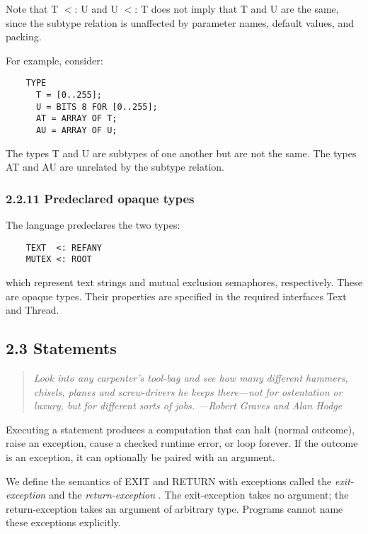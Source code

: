 \documentclass[10pt]{article}
\begin{document}
  Note that T $<$: U and U $<$: T does not imply that T and U are the same, since the subtype relation is unaffected by parameter names, default values, and packing. 


  For example, consider: 
\begin{verbatim}
    TYPE 
      T = [0..255];
      U = BITS 8 FOR [0..255];
      AT = ARRAY OF T;
      AU = ARRAY OF U;
\end{verbatim}
 The types T and U are subtypes of one another but are not the same. The types AT and AU are unrelated by the subtype relation. 


 
\subsubsection*{2.2.11 Predeclared opaque types}


  The language predeclares the two types: 
\begin{verbatim}
    TEXT  <: REFANY
    MUTEX <: ROOT
\end{verbatim}
 which represent text strings and mutual exclusion semaphores, respectively. These are opaque types. Their properties are specified in the required interfaces Text and Thread. 


 
\subsection*{2.3 Statements}


 
\begin{quote}
\emph{ Look into any carpenter's tool-bag and see how many different hammers, chisels, planes and screw-drivers he keeps there---not for ostentation or luxury, but for different sorts of jobs. ---Robert Graves and Alan Hodge }
\end{quote}



 Executing a statement produces a computation that can halt (normal outcome), raise an exception, cause a checked runtime error, or loop forever. If the outcome is an exception, it can optionally be paired with an argument. 


 We define the semantics of EXIT and RETURN with exceptions called the \emph{exit-exception}
 and the \emph{return-exception}
. The exit-exception takes no argument; the return-exception takes an argument of arbitrary type. Programs cannot name these exceptions explicitly. 
\end{document}
